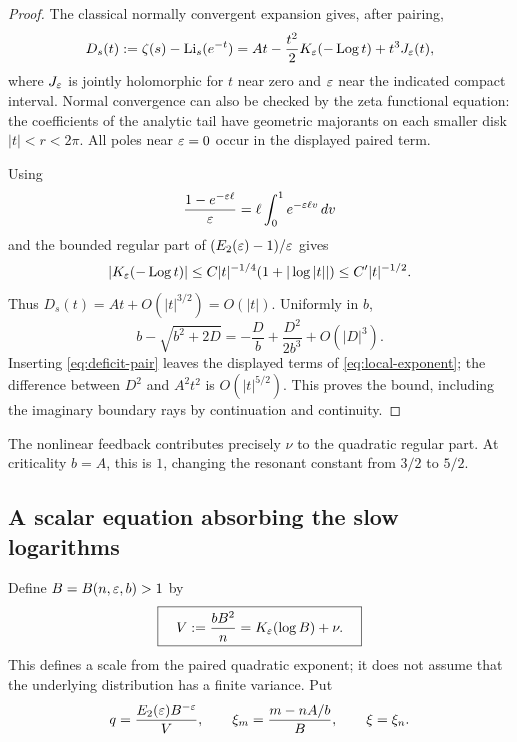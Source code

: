 \begin{proof}
The classical normally convergent expansion \cite[25.12.12]{dlmf-polylog}
gives, after pairing,
\begin{equation}\label{eq:deficit-pair}
 D_s(t):=\zeta(s)-\operatorname{Li}_s(e^{-t})
 =At-\frac{t^2}{2}K_\varepsilon(-\operatorname{Log} t)+t^3 J_\varepsilon(t),
\end{equation}
where $J_\varepsilon$ is jointly holomorphic for $t$ near zero and $\varepsilon$
near the indicated compact interval. Normal convergence can also be
checked by the zeta functional equation: the coefficients of the
analytic tail have geometric majorants on each smaller disk
$|t|<r<2\pi$. All poles near $\varepsilon=0$ occur in the displayed paired term.

Using
\[
 \frac{1-e^{-\varepsilon\ell}}{\varepsilon}
  =\ell\int_0^1e^{-\varepsilon\ell v}\,dv
\]
and the bounded regular part of $(E_2(\varepsilon)-1)/\varepsilon$ gives
\[
 |K_\varepsilon(-\operatorname{Log} t)|
 \le C|t|^{-1/4}(1+|\log|t||)\le C'|t|^{-1/2}.
\]
Thus $D_s(t)=At+O(|t|^{3/2})=O(|t|)$. Uniformly in $b$,
\[
 b-\sqrt{b^2+2D}
 =-\frac Db+\frac{D^2}{2b^3}+O(|D|^3).
\]
Inserting \eqref{eq:deficit-pair} leaves the displayed terms of
\eqref{eq:local-exponent}; the difference between $D^2$ and
$A^2t^2$ is $O(|t|^{5/2})$. This proves the bound, including the
imaginary boundary rays by continuation and continuity.
\end{proof}

The nonlinear feedback contributes precisely $\nu$ to the quadratic
regular part. At criticality $b=A$, this is $1$, changing the
resonant constant from $3/2$ to $5/2$.

\subsection{A scalar equation absorbing the slow logarithms}

Define $B=B(n,\varepsilon,b)>1$ by
\begin{equation}\label{eq:scale}
 \boxed{\displaystyle\quad
 V:=\frac{bB^2}{n}=K_\varepsilon(\log B)+\nu.
 \quad}
\end{equation}
This defines a scale from the paired quadratic exponent; it does not
assume that the underlying distribution has a finite variance. Put
\begin{equation}\label{eq:q-xi}
 q=\frac{E_2(\varepsilon)B^{-\varepsilon}}{V},\qquad
 \xi_m=\frac{m-nA/b}{B},\qquad \xi=\xi_n.
\end{equation}

